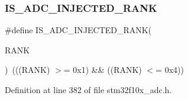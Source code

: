 \subsubsection{\texorpdfstring{I\+S\+\_\+\+A\+D\+C\+\_\+\+I\+N\+J\+E\+C\+T\+E\+D\+\_\+\+R\+A\+NK}{IS\_ADC\_INJECTED\_RANK}}
{\footnotesize\ttfamily \#define I\+S\+\_\+\+A\+D\+C\+\_\+\+I\+N\+J\+E\+C\+T\+E\+D\+\_\+\+R\+A\+NK(\begin{DoxyParamCaption}\item[{}]{R\+A\+NK }\end{DoxyParamCaption})~(((R\+A\+NK) $>$= 0x1) \&\& ((\+R\+A\+N\+K) $<$= 0x4))}



Definition at line 382 of file stm32f10x\+\_\+adc.\+h.

